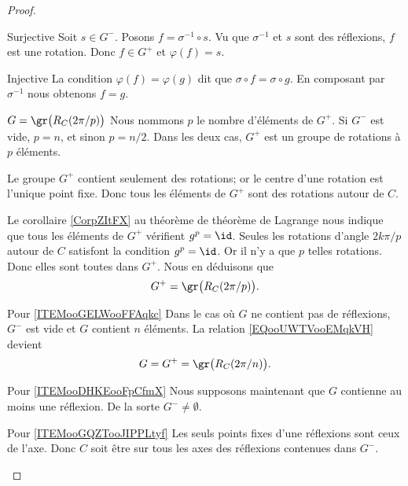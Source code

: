 \begin{proof}
\begin{subproof}
            \begin{subproof}
                \item[Surjective]
                    Soit \( s\in G^-\). Posons \( f=\sigma^{-1}\circ s\). Vu que \( \sigma^{-1}\) et \( s\) sont des réflexions, \( f\) est une rotation. Donc \( f\in G^+\) et \( \varphi(f)=s\).
                \item[Injective]
                    La condition \( \varphi(f)=\varphi(g)\) dit que \( \sigma\circ f=\sigma\circ g\). En composant par \( \sigma^{-1}\) nous obtenons \( f=g\).
            \end{subproof}
        \item[\( G=\gr\big(R_C(2\pi /p)\big)\)]
            Nous nommons \( p\) le nombre d'éléments de \( G^+\). Si \( G^-\) est vide, \( p=n\), et sinon \( p=n/2\). Dans les deux cas, \( G^+\) est un groupe de rotations à \( p\) éléments. 

            Le groupe \( G^+\) contient seulement des rotations; or le centre d'une rotation est l'unique point fixe. Donc tous les éléments de \( G^+\) sont des rotations autour de \( C\).
            
            Le corollaire \ref{CorpZItFX} au théorème de théorème de Lagrange nous indique que tous les éléments de \( G^+\) vérifient \( g^p=\id\). Seules les rotations d'angle \( 2k\pi/p\) autour de \( C\) satisfont la condition \( g^p=\id\). Or il n'y a que \( p\) telles rotations. Donc elles sont toutes dans \( G^+\). Nous en déduisons que
            \begin{equation}        \label{EQooUWTVooEMqkVH}
                G^+=\gr\big( R_C(2\pi/p) \big).
            \end{equation}
        \item[Pour \ref{ITEMooGELWooFFAqkc}]
            Dans le cas où \( G\) ne contient pas de réflexions, \( G^-\) est vide et \( G\) contient \( n\) éléments. La relation \eqref{EQooUWTVooEMqkVH} devient
            \begin{equation}
                G=G^+=\gr\big( R_C(2\pi/n) \big).
            \end{equation}
        \item[Pour \ref{ITEMooDHKEooFpCfmX}]
            Nous supposons maintenant que \( G\) contienne au moins une réflexion. De la sorte \( G^-\neq \emptyset\).
            \begin{subproof}
            \item[Pour \ref{ITEMooGQZTooJIPPLtyf}]
                Les seuls points fixes d'une réflexions sont ceux de l'axe. Donc \( C\) soit être sur tous les axes des réflexions contenues dans \( G^-\).


\end{subproof}
\end{subproof}
\end{proof}
